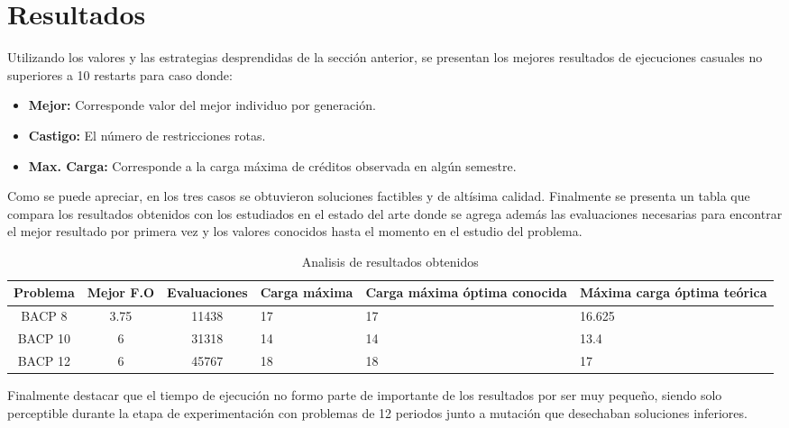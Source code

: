 \documentclass[letter, 10pt]{article}
\begin{document}
\section{Resultados}
Utilizando los valores y las estrategias desprendidas de la sección anterior, se
presentan los mejores resultados de ejecuciones casuales no superiores a 10
restarts para caso donde:

\begin{itemize}
  \item \textbf{Mejor:} Corresponde valor del mejor individuo por generación.
  \item \textbf{Castigo:} El número de restricciones rotas.
  \item \textbf{Max. Carga:} Corresponde a la carga máxima de créditos observada en algún semestre.
\end{itemize}

\begin{center}

\end{center}
\begin{center}

\end{center}
\begin{center}

\end{center}

Como se puede apreciar, en los tres casos se obtuvieron soluciones factibles y
de altísima calidad.  Finalmente se presenta un tabla que compara los resultados
obtenidos con los estudiados en el estado del arte donde se agrega además las
evaluaciones necesarias para encontrar el mejor resultado por primera vez y los
valores conocidos hasta el momento en el estudio del problema.


\begin{table}[h]
\centering
\caption{Analisis de resultados obtenidos}
\begin{tabular}{|c|c|c|p{2cm}|p{2cm}|p{2cm}|}
\hline 
Problema & Mejor F.O & Evaluaciones  & Carga máxima & Carga máxima óptima conocida & Máxima carga óptima teórica\tabularnewline
\hline 
\hline 
BACP 8 & 3.75 & 11438 & 17 & 17 & 16.625\tabularnewline
\hline 
BACP 10 & 6 & 31318 & 14 & 14 & 13.4\tabularnewline
\hline 
BACP 12 & 6 & 45767 & 18 & 18 & 17\tabularnewline
\hline
\end{tabular}
\end{table}

Finalmente destacar que el tiempo de ejecución no formo parte de importante de
los resultados por ser muy pequeño, siendo solo perceptible durante la etapa de
experimentación con problemas de 12 periodos junto a mutación que
desechaban soluciones inferiores.
\end{document}
